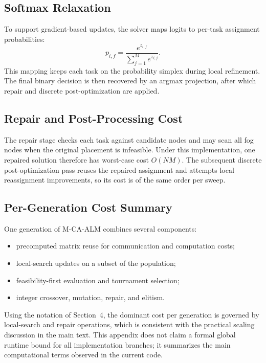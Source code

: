 \begin{appendices}
\subsection{Softmax Relaxation}
\label{appendix:relaxation}
To support gradient-based updates, the solver maps logits to per-task assignment probabilities:
\begin{equation}
    p_{i,f} = \frac{e^{z_{i,f}}}{\sum_{j=1}^{M} e^{z_{i,j}}}.
\end{equation}
This mapping keeps each task on the probability simplex during local refinement. The final binary decision is then recovered by an argmax projection, after which repair and discrete post-optimization are applied.

\subsection{Repair and Post-Processing Cost}
\label{appendix:complexity}
The repair stage checks each task against candidate nodes and may scan all fog nodes when the original placement is infeasible. Under this implementation, one repaired solution therefore has worst-case cost $O(NM)$. The subsequent discrete post-optimization pass reuses the repaired assignment and attempts local reassignment improvements, so its cost is of the same order per sweep.

\subsection{Per-Generation Cost Summary}
One generation of M-CA-ALM combines several components:
\begin{itemize}
    \item precomputed matrix reuse for communication and computation costs;
    \item local-search updates on a subset of the population;
    \item feasibility-first evaluation and tournament selection;
    \item integer crossover, mutation, repair, and elitism.
\end{itemize}
Using the notation of Section~4, the dominant cost per generation is governed by local-search and repair operations, which is consistent with the practical scaling discussion in the main text. This appendix does not claim a formal global runtime bound for all implementation branches; it summarizes the main computational terms observed in the current code.
\end{appendices}
